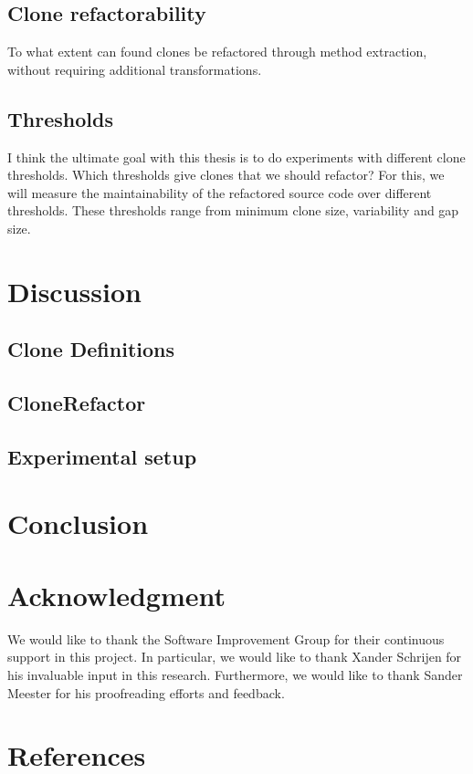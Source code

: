 \documentclass[conference]{IEEEtran}
\begin{document}
\subsection{Clone refactorability}
To what extent can found clones be refactored through method extraction, without requiring additional transformations.

\subsection{Thresholds}
I think the ultimate goal with this thesis is to do experiments with different clone thresholds. Which thresholds give clones that we should refactor? For this, we will measure the maintainability of the refactored source code over different thresholds. These thresholds range from minimum clone size, variability and gap size.

\section{Discussion}
\subsection{Clone Definitions}

\subsection{CloneRefactor}

\subsection{Experimental setup}

\section{Conclusion}

\section*{Acknowledgment}
We would like to thank the Software Improvement Group for their continuous support in this project. In particular, we would like to thank Xander Schrijen for his invaluable input in this research. Furthermore, we would like to thank Sander Meester for his proofreading efforts and feedback.

\section*{References}
\end{document}
